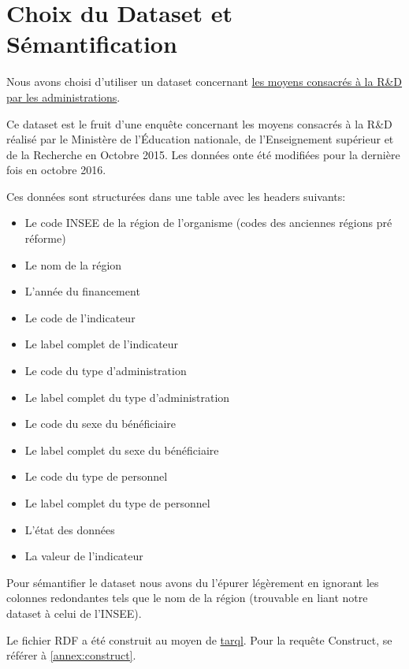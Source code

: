 \chapter{Choix du Dataset et Sémantification}

Nous avons choisi d'utiliser un dataset concernant \href{https://data.enseignementsup-recherche.gouv.fr/explore/dataset/fr-esr-rd-moyens-administrations-type-organisme/}{les moyens consacrés à la R\&D par les administrations}.

Ce dataset est le fruit d'une enquête concernant les moyens consacrés à la R\&D réalisé par le Ministère de l'Éducation nationale, de l'Enseignement supérieur et de la Recherche en Octobre 2015. Les données onte été modifiées pour la dernière fois en octobre 2016.

Ces données sont structurées dans une table avec les headers suivants:
\begin{itemize}
    \item Le code INSEE de la région de l'organisme (codes des anciennes régions pré réforme)
    \item Le nom de la région
    \item L'année du financement
    \item Le code de l'indicateur
    \item Le label complet de l'indicateur
    \item Le code du type d'administration
    \item Le label complet du type d'administration
    \item Le code du sexe du bénéficiaire
    \item Le label complet du sexe du bénéficiaire
    \item Le code du type de personnel
    \item Le label complet du type de personnel
    \item L'état des données
    \item La valeur de l'indicateur
\end{itemize}

\vskip1cm

Pour sémantifier le dataset nous avons du l'épurer légèrement en ignorant les colonnes redondantes tels que le nom de la région (trouvable en liant notre dataset à celui de l'INSEE).

Le fichier RDF a été construit au moyen de \href{https://tarql.github.io/}{tarql}. Pour la requête Construct, se référer à \autoref{annex:construct}.

